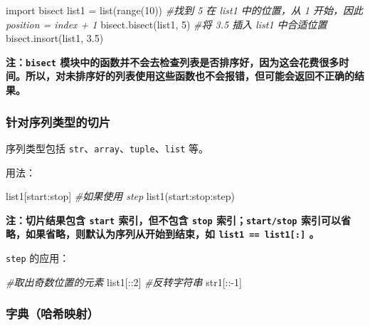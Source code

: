 \documentclass[]{article}
\newenvironment{Shaded}{}{}
\newcommand{\DecValTok}[1]{\textcolor[rgb]{0.25,0.63,0.44}{#1}}
\newcommand{\FloatTok}[1]{\textcolor[rgb]{0.25,0.63,0.44}{#1}}
\newcommand{\ImportTok}[1]{#1}
\newcommand{\CommentTok}[1]{\textcolor[rgb]{0.38,0.63,0.69}{\textit{#1}}}
\newcommand{\OperatorTok}[1]{\textcolor[rgb]{0.40,0.40,0.40}{#1}}
\newcommand{\BuiltInTok}[1]{#1}
\newcommand{\NormalTok}[1]{#1}
\begin{document}
\begin{Shaded}
\begin{Highlighting}[]
\ImportTok{import}\NormalTok{ bisect}
\NormalTok{list1 }\OperatorTok{=} \BuiltInTok{list}\NormalTok{(}\BuiltInTok{range}\NormalTok{(}\DecValTok{10}\NormalTok{))}
\CommentTok{#找到 5 在 list1 中的位置，从 1 开始，因此 position = index + 1}
\NormalTok{bisect.bisect(list1, }\DecValTok{5}\NormalTok{)}
\CommentTok{#将 3.5 插入 list1 中合适位置}
\NormalTok{bisect.insort(list1, }\FloatTok{3.5}\NormalTok{)}
\end{Highlighting}
\end{Shaded}

\textbf{注：\texttt{bisect}
模块中的函数并不会去检查列表是否排序好，因为这会花费很多时间。所以，对未排序好的列表使用这些函数也不会报错，但可能会返回不正确的结果。}

\subsubsection{针对序列类型的切片}\label{header-n163}

序列类型包括 \texttt{str}、\texttt{array}、\texttt{tuple}、\texttt{list}
等。

用法：

\begin{Shaded}
\begin{Highlighting}[]
\NormalTok{list1[start:stop]}
\CommentTok{#如果使用 step}
\NormalTok{list1(start:stop:step)}
\end{Highlighting}
\end{Shaded}

\textbf{注：切片结果包含 \texttt{start} 索引，但不包含 \texttt{stop}
索引；\texttt{start/stop}
索引可以省略，如果省略，则默认为序列从开始到结束，如
\texttt{list1\ ==\ list1{[}:{]}} 。}

\texttt{step} 的应用：

\begin{Shaded}
\begin{Highlighting}[]
\CommentTok{#取出奇数位置的元素}
\NormalTok{list1[::}\DecValTok{2}\NormalTok{]}
\CommentTok{#反转字符串}
\NormalTok{str1[::}\OperatorTok{-}\DecValTok{1}\NormalTok{]}
\end{Highlighting}
\end{Shaded}

\subsubsection{字典（哈希映射）}\label{header-n174}
\end{document}
